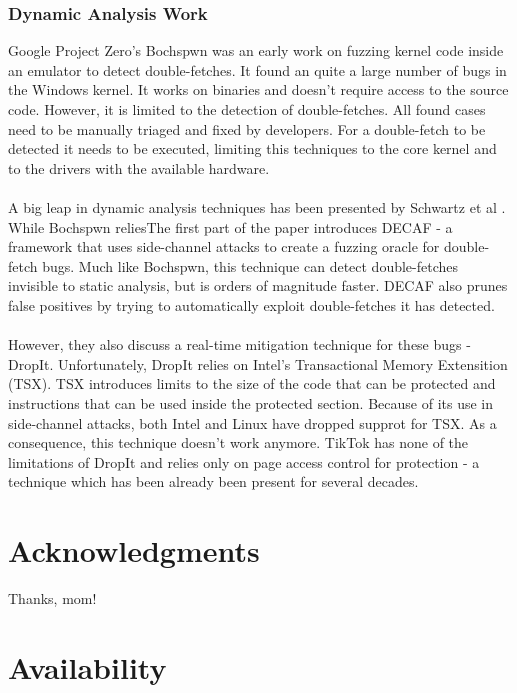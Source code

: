 \subsubsection{Dynamic Analysis Work}
Google Project Zero's Bochspwn \cite{bochspwn} was an early work on fuzzing kernel code inside an emulator to detect double-fetches. It found an quite a large number of bugs in the Windows
kernel. It works on binaries and doesn't require access to the source code. However, it is limited to the detection of double-fetches. All found cases need to be manually triaged and fixed
by developers. For a double-fetch to be detected it needs to be executed, limiting this techniques to the core kernel and to the drivers with the available hardware.
\\
\\
A big leap in dynamic analysis techniques has been presented by Schwartz et al \cite{schwarz18}. While Bochspwn reliesThe first part of the paper introduces DECAF - a framework that uses side-channel attacks to
create a fuzzing oracle for double-fetch bugs. Much like Bochspwn, this technique can detect double-fetches invisible to static analysis, but is orders of magnitude faster. DECAF also prunes
false positives by trying to automatically exploit double-fetches it has detected.
\\
\\
However, they also discuss a real-time mitigation technique for these bugs - DropIt. Unfortunately, DropIt relies 
on Intel's Transactional Memory Extensition (TSX). TSX introduces limits to the size of the code that can be protected and instructions that can be used inside the protected section. Because
of its use in side-channel attacks, both Intel and Linux have dropped supprot for TSX. As a consequence, this technique doesn't work anymore. TikTok has none of the limitations of DropIt and
relies only on page access control for protection - a technique which has been already been present for several decades.


\section*{Acknowledgments}

Thanks, mom!

\section*{Availability}


